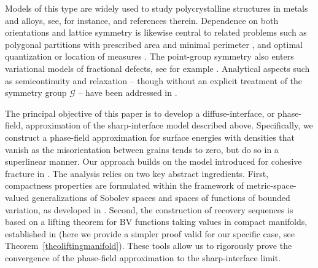 \documentclass[a4paper,reqno]{amsart}
\newcommand{\BV}{\mathrm{BV}}
\theoremstyle{remark}
\newcommand{\G}{\mathcal{G}}
\numberwithin{equation}{section}
\begin{document}
Models of this type are widely used to study
polycrystalline  structures in metals and alloys, see, for instance,
\cite{CahnTaylor2004,BerkelsRaetzRumpfVoigt2008,ElsWir,RunnelsBeyerleinContiOrtiz2016a} and references therein.
Dependence on both orientations and lattice symmetry is likewise central to related problems such as polygonal partitions
with prescribed area and minimal perimeter \cite{DelNinThesis}, and optimal  quantization or location of measures \cite{BouPeRo,CaGoIa}.
The point-group symmetry also enters variational models of
fractional defects, see for example \cite{BadCicDeLPon18,BadCic,GolMerMil}.
Analytical aspects such as semicontinuity and relaxation -- though without an explicit treatment of the symmetry group $\G$ -- have been addressed in
\cite{ambrosio1990functionals,morgan1997lowersemicontinuity,Caraballo2008}.

The principal objective of this paper is to develop a diffuse-interface, or phase-field,  approximation of the sharp-interface model described above. Specifically,  we construct a
 phase-field approximation for surface energies with densities that vanish as the misorientation between grains tends to zero, but do so in a superlinear manner. Our approach builds on the model introduced for cohesive fracture in \cite{CFI14,ConFocIur25}.
The analysis relies on
two key abstract ingredients.
First,  compactness properties
are formulated within the framework of
metric-space-valued generalizations of Sobolev spaces and spaces of functions of bounded variation, as developed in \cite{Resh,Amb90SBVX}. Second, the construction of recovery sequences is based on a lifting theorem for $\BV$ functions taking values in  compact manifolds, established in  \cite{CanOrl20JFA}
(here we provide a simpler proof valid for our specific case, see Theorem~\ref{theoliftingmanifold}). These tools allow us to rigorously prove
the convergence of the phase-field approximation to the sharp-interface limit.
\end{document}
